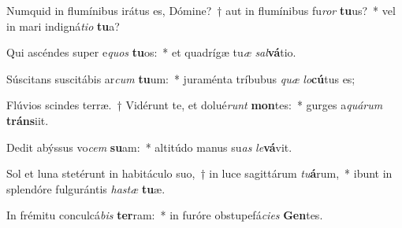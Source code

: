 \item Numquid in flumínibus irátus es, Dómine?~† aut in flumínibus fu\textit{ror} \textbf{tu}us?~* vel in mari indigná\textit{ti}\textit{o} \textbf{tu}a?
\item Qui ascéndes super e\textit{quos} \textbf{tu}os:~* et quadrígæ tu\textit{æ} \textit{sal}\textbf{vá}tio.
\item Súscitans suscitábis ar\textit{cum} \textbf{tu}um:~* juraménta tríbubus \textit{quæ} \textit{lo}\textbf{cú}tus es;
\item Flúvios scindes terræ.~† Vidérunt te, et dolué\textit{runt} \textbf{mon}tes:~* gurges a\textit{quá}\textit{rum} \textbf{tráns}iit.
\item Dedit abýssus vo\textit{cem} \textbf{su}am:~* altitúdo manus su\textit{as} \textit{le}\textbf{vá}vit.
\item Sol et luna stetérunt in habitáculo suo,~† in luce sagittárum \textit{tu}\textbf{á}rum,~* ibunt in splendóre fulgurántis \textit{has}\textit{tæ} \textbf{tu}æ.
\item In frémitu conculcá\textit{bis} \textbf{ter}ram:~* in furóre obstupefá\textit{ci}\textit{es} \textbf{Gen}tes.
